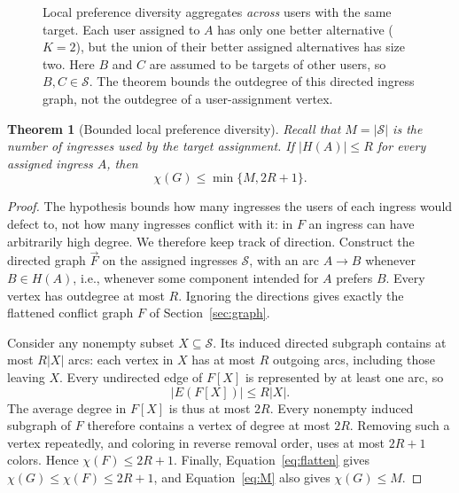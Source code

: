 \documentclass[10pt,a4paper]{article}
\newtheorem{theorem}{Theorem}
\newcommand{\Sset}{\mathcal S}
\begin{document}
\begin{figure}[tbp]
\centering
{}
\caption{Local preference diversity aggregates \emph{across} users with the same target. Each user assigned to $A$ has only one better alternative ($K=2$), but the union of their better assigned alternatives has size two. Here $B$ and $C$ are assumed to be targets of other users, so $B,C\in\Sset$. The theorem bounds the outdegree of this directed ingress graph, not the outdegree of a user-assignment vertex.}
\label{fig:local}
\end{figure}

\begin{theorem}[Bounded local preference diversity]\label{thm:local}
Recall that $M=|\Sset|$ is the number of ingresses used by the target assignment. If $|H(A)|\le R$ for every assigned ingress $A$, then
\[
\boxed{\chi(G)\le\min\{M,2R+1\}.}
\]
\end{theorem}
\begin{proof}
The hypothesis bounds how many ingresses the users of each ingress would defect to, not how many ingresses conflict with it: in $F$ an ingress can have arbitrarily high degree. We therefore keep track of direction. Construct the directed graph $\vec F$ on the assigned ingresses $\Sset$, with an arc $A\to B$ whenever $B\in H(A)$, i.e., whenever some component intended for $A$ prefers $B$. Every vertex has outdegree at most $R$. Ignoring the directions gives exactly the flattened conflict graph $F$ of Section~\ref{sec:graph}.

Consider any nonempty subset $X\subseteq\Sset$. Its induced directed subgraph contains at most $R|X|$ arcs: each vertex in $X$ has at most $R$ outgoing arcs, including those leaving $X$. Every undirected edge of $F[X]$ is represented by at least one arc, so
\[
|E(F[X])|\le R|X|.
\]
The average degree in $F[X]$ is thus at most $2R$. Every nonempty induced subgraph of $F$ therefore contains a vertex of degree at most $2R$. Removing such a vertex repeatedly, and coloring in reverse removal order, uses at most $2R+1$ colors. Hence $\chi(F)\le 2R+1$. Finally, Equation~\eqref{eq:flatten} gives $\chi(G)\le\chi(F)\le2R+1$, and Equation~\eqref{eq:M} also gives $\chi(G)\le M$.
\end{proof}
\end{document}
